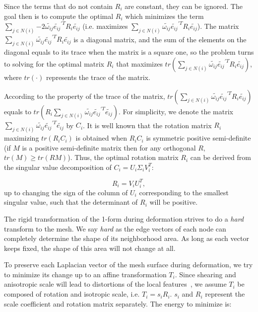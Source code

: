 Since the terms that do not contain $R_i$ are constant, they can be ignored.
The goal then is to compute the optimal $R_i$ which  minimizes the term
$\sum\limits_{j\in N(i)}{-2\tilde{\omega_{ij}} \tilde{e_{ij}}^{\prime T}R_i\tilde{e_{ij}}}$
(i.e. maximizes $\sum\limits_{j\in N(i)}{\tilde{\omega_{ij}} \tilde{e_{ij}}^{\prime T}R_i\tilde{e_{ij}}}$).
The matrix $\sum\limits_{j\in N(i)}{\tilde{\omega_{ij}} \tilde{e_{ij}}^{\prime T}R_i\tilde{e_{ij}}}$
is a diagonal matrix, and the sum of the elements on the diagonal equals to
its trace when the matrix is a square one, so the problem turns to
solving for the optimal matrix $R_i$ that maximizes
$tr (\sum\limits_{j\in N(i)}{\tilde{\omega_{ij}} \tilde{e_{ij}}^{\prime T}R_i\tilde{e_{ij}}})$,
where $tr(\cdot)$ represents the trace of the matrix.

According to the property of the trace of the matrix,
$tr (\sum\limits_{j\in N(i)}{\tilde{\omega_{ij}} \tilde{e_{ij}}^{\prime T}R_i\tilde{e_{ij}}})$
equals to $tr (R_i \sum\limits_{j\in N(i)}{\tilde{\omega_{ij}} \tilde{e_{ij}}^{\prime T}\tilde{e_{ij}}})$.
For simplicity, we denote the matrix
$\sum\limits_{j\in N(i)}{\tilde{\omega_{ij}} \tilde{e_{ij}}^{\prime T}\tilde{e_{ij}}}$ by $C_i$.
It is well known that the rotation matrix $R_i$ maximizing $tr(R_iC_i)$ is
obtained when $R_iC_i$ is symmetric positive semi-definite (if $M$ is a
positive semi-definite matrix then for any orthogonal $R$, $tr(M)\geq tr(RM)$).
Thus, the optimal rotation matrix $R_i$ can be derived from the
singular value decomposition of $C_i=U_i \Sigma_i V_i^T$:

\begin{equation}
\label{eq:rotationmatsvd}
R_i=V_iU_i^T,
\end{equation}
up to changing the sign of the column of $U_i$ corresponding to the
smallest singular value, such that the determinant of $R_i$ will be positive.

The rigid transformation of the 1-form during  deformation strives
to do a \textit{hard} transform to the mesh. We say \textit{hard} as
the edge vectors of each node can completely determine the shape of
its neighborhood area. As long as each vector keeps fixed, the shape
of this area will not change at all.

To preserve each Laplacian vector of the mesh  surface during
deformation, we try to minimize its change up to an affine
transformation $T_i$. Since shearing and anisotropic scale will lead
to distortions of the local features~\cite{FAT07}, we assume $T_i$
be composed of rotation and isotropic scale, i.e. $T_i=s_iR_i$.
$s_i$ and $R_i$ represent the scale coefficient and rotation matrix
separately. The energy to minimize is:

